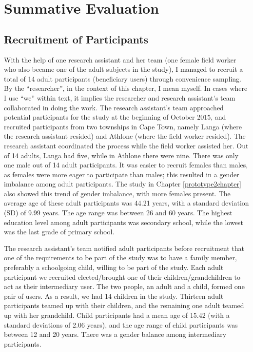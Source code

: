 
\chapter{Summative Evaluation} %

\label{summativeevalchapter} %


\section{Recruitment of Participants}
With the help of one research assistant and her team (one female field worker who also became one of the adult subjects in the study), I managed to recruit a total of 14 adult participants (beneficiary users) through convenience sampling. By the ``researcher'', in the context of this chapter, I mean myself. In cases where I use ``we'' within text, it implies the researcher and research assistant's team collaborated in doing the work. The research assistant's team approached potential participants for the study at the beginning of  October 2015, and recruited participants from two townships in Cape Town, namely Langa (where the research assistant resided) and Athlone (where the field worker resided). The research assistant coordinated the process while the field worker assisted her. Out of 14 adults, Langa had five, while in Athlone there were nine. There was only one male out of 14 adult participants. It was easier to  recruit females than males, as females were more eager to participate than males; this resulted in a gender imbalance among adult participants.  The study in Chapter \ref{prototype2chapter} also showed this trend of gender imbalance, with more females present. The average age of these adult participants was 44.21 years, with a standard deviation (SD) of 9.99 years. The age range was between 26 and 60 years. The highest education level among adult participants was secondary school, while the lowest was the last grade of primary school. 

The research assistant's team notified adult participants before recruitment that one of the requirements to be part of the study was to have a family member, preferably a schoolgoing child, willing to be part of the study. Each adult participant we recruited elected/brought one of their children/grandchildren to act as their intermediary user. The two people, an adult and a child, formed one pair of users. As a result, we had 14 children in the study. Thirteen adult participants teamed up with their children, and the remaining one adult teamed up with her grandchild. Child participants had a mean age of 15.42 (with a standard deviations of 2.06 years), and the age range of child participants was between 12  and 20 years. There was a gender balance among intermediary participants. 

